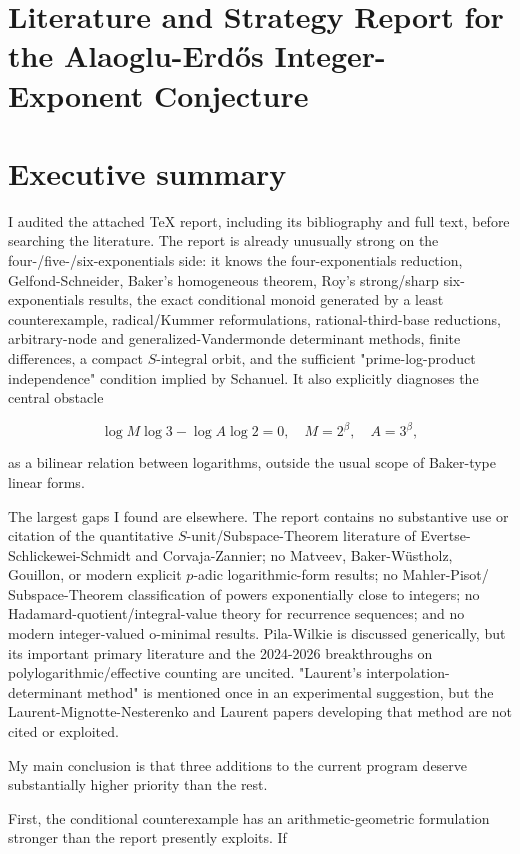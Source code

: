 \documentclass[10pt]{article}
\begin{document}
\section*{Literature and Strategy Report for the Alaoglu-Erdős Integer-Exponent Conjecture}
\section*{Executive summary}
I audited the attached TeX report, including its bibliography and full text, before searching the literature. The report is already unusually strong on the four-/five-/six-exponentials side: it knows the four-exponentials reduction, Gelfond-Schneider, Baker's homogeneous theorem, Roy's strong/sharp six-exponentials results, the exact conditional monoid generated by a least counterexample, radical/Kummer reformulations, rational-third-base reductions, arbitrary-node and generalized-Vandermonde determinant methods, finite differences, a compact $S$-integral orbit, and the sufficient "prime-log-product independence" condition implied by Schanuel. It also explicitly diagnoses the central obstacle

$$
\log M \log 3-\log A \log 2=0, \quad M=2^{\beta}, \quad A=3^{\beta},
$$

as a bilinear relation between logarithms, outside the usual scope of Baker-type linear forms.

The largest gaps I found are elsewhere. The report contains no substantive use or citation of the quantitative $S$-unit/Subspace-Theorem literature of Evertse-Schlickewei-Schmidt and Corvaja-Zannier; no Matveev, Baker-Wüstholz, Gouillon, or modern explicit $p$-adic logarithmic-form results; no Mahler-Pisot/ Subspace-Theorem classification of powers exponentially close to integers; no Hadamard-quotient/integral-value theory for recurrence sequences; and no modern integer-valued o-minimal results. Pila-Wilkie is discussed generically, but its important primary literature and the 2024-2026 breakthroughs on polylogarithmic/effective counting are uncited. "Laurent's interpolation-determinant method" is mentioned once in an experimental suggestion, but the Laurent-Mignotte-Nesterenko and Laurent papers developing that method are not cited or exploited.

My main conclusion is that three additions to the current program deserve substantially higher priority than the rest.

First, the conditional counterexample has an arithmetic-geometric formulation stronger than the report presently exploits. If
\end{document}
